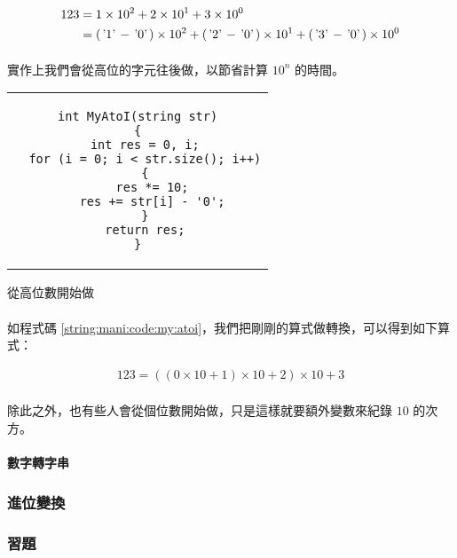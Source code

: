 \documentclass[12pt,a4paper,oneside]{article}
\begin{document}
\begin{CJK}{UTF8}{bkai}
\begin{align*}
123&=1\times{{10}^2}+2\times{{10}^1}+3\times{{10}^0}\\
&=(\text{\lstinline!'1'!}-\text{\lstinline!'0'!})\times{{10}^2}+(\text{\lstinline!'2'!}-\text{\lstinline!'0'!})\times{{10}^1}+(\text{\lstinline!'3'!}-\text{\lstinline!'0'!})\times{{10}^0}
\end{align*}

\paragraph{}實作上我們會從高位的字元往後做，以節省計算 ${10}^n$ 的時間。

\begin{code}[h!]
  \centering
  \begin{tabular}{c}
  \begin{lstlisting}
int MyAtoI(string str)
{
  int res = 0, i;
  for (i = 0; i < str.size(); i++)
  {
    res *= 10;
    res += str[i] - '0';
  }
  return res;
}
  \end{lstlisting}
  \end{tabular}
  \caption{從高位數開始做}
  \label{string:mani:code:my:atoi}
\end{code}

\paragraph{}如程式碼 \ref{string:mani:code:my:atoi}，我們把剛剛的算式做轉換，可以得到如下算式：

\begin{align*}
123={({(0\times{10}+1)}\times{10}+2)}\times{10}+3
\end{align*}

\paragraph{}除此之外，也有些人會從個位數開始做，只是這樣就要額外變數來紀錄 $10$ 的次方。

\paragraph{數字轉字串}

\subsubsection{進位變換}

\subsubsection{習題}

\ifx \allfiles \undefined

\printindex

\clearpage
\end{CJK}
\end{document}
